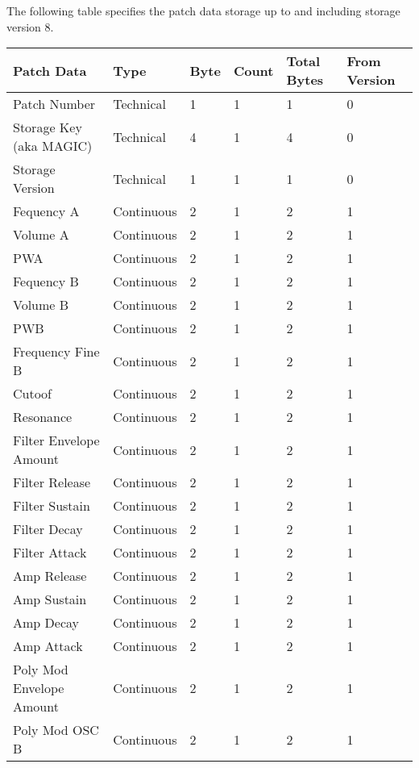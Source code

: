 The following table specifies the patch data storage up to and including storage version 8. 

\footnotesize
\renewcommand{\arraystretch}{1.3}

\begin{longtable}[l]{|p{5cm}|p{2cm}|p{1.5cm}|p{1.5cm}|p{2cm}|p{2.5cm}|} 
\hline
\textbf{Patch Data} & \textbf{Type} & \textbf{Byte} & \textbf{Count} & \textbf{Total Bytes} & \textbf{From Version} \\ \hline
Patch Number & Technical & 1 & 1 & 1 & 0 \\ \hline
Storage Key (aka MAGIC) & Technical & 4 & 1 & 4 & 0 \\ \hline
Storage Version & Technical & 1 & 1 & 1 & 0 \\ \hline
Fequency A & Continuous & 2 & 1 & 2 & 1 \\ \hline
Volume A & Continuous & 2 & 1 & 2 & 1 \\ \hline
PWA & Continuous & 2 & 1 & 2 & 1 \\ \hline
Fequency B & Continuous & 2 & 1 & 2 & 1 \\ \hline
Volume B & Continuous & 2 & 1 & 2 & 1 \\ \hline
PWB & Continuous & 2 & 1 & 2 & 1 \\ \hline
Frequency Fine B & Continuous & 2 & 1 & 2 & 1 \\ \hline
Cutoof & Continuous & 2 & 1 & 2 & 1 \\ \hline
Resonance & Continuous & 2 & 1 & 2 & 1 \\ \hline
Filter Envelope Amount & Continuous & 2 & 1 & 2 & 1 \\ \hline
Filter Release & Continuous & 2 & 1 & 2 & 1 \\ \hline
Filter Sustain & Continuous & 2 & 1 & 2 & 1 \\ \hline
Filter Decay & Continuous & 2 & 1 & 2 & 1 \\ \hline
Filter Attack & Continuous & 2 & 1 & 2 & 1 \\ \hline
Amp Release & Continuous & 2 & 1 & 2 & 1 \\ \hline
Amp Sustain & Continuous & 2 & 1 & 2 & 1 \\ \hline
Amp Decay & Continuous & 2 & 1 & 2 & 1 \\ \hline
Amp Attack & Continuous & 2 & 1 & 2 & 1 \\ \hline
Poly Mod Envelope Amount & Continuous & 2 & 1 & 2 & 1 \\ \hline
Poly Mod OSC B & Continuous & 2 & 1 & 2 & 1 \\ \hline

\end{longtable}
